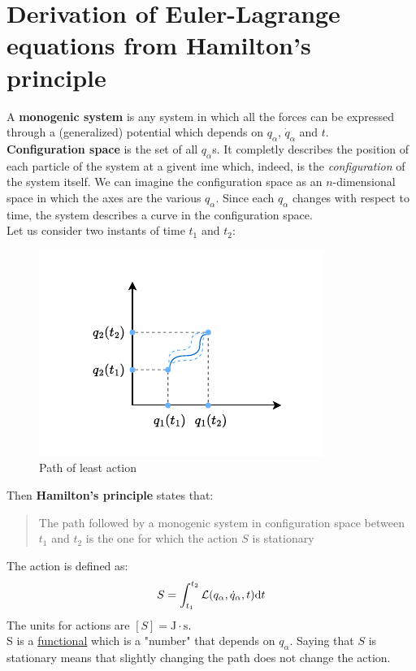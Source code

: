 \section{Derivation of Euler-Lagrange equations from Hamilton's principle}
A \textbf{monogenic system} is any system in which all the forces can be expressed through a (generalized) potential which depends on $q_{\alpha}$, $\dot{q}_{\alpha}$ and $t$.\\
\textbf{Configuration space} is the set of all $q_{\alpha}$s. It completly describes the position of each particle of the system at a givent ime which, indeed, is the \textit{configuration} of the system itself. We can imagine the configuration space as an $n$-dimensional space in which the axes are the various $q_{\alpha}$.
Since each $q_{\alpha}$ changes with respect to time, the system describes a curve in the configuration space.\\
Let us consider two instants of time $t_1$ and $t_2$:
\begin{figure}[!ht]
    \centering
    \includegraphics[width=0.6\linewidth]{res/svg/leastactionpath.drawio}
    \caption{Path of least action}
    \label{fig:image9}
\end{figure}
Then \textbf{Hamilton's principle} states that:
\begin{quote} \label{q:Hamilton_principle_quote}
    The path followed by a monogenic system in configuration space between $t_1$ and $t_2$ is the one for which the action $S$ is stationary
\end{quote}
The action is defined as:
\begin{equation}
    S = \int_{t_1}^{t_2}\mathcal{L}(q_{\alpha},\dot{q}_{\alpha},t) \mathrm{d}t
\end{equation}
The units for actions are $[S] = \mathrm{J\cdot s}$.\\S is a \underline{functional} which is a "number" that depends on $q_{\alpha}$. Saying that $S$ is stationary means that slightly changing the path does not change the action.\\
